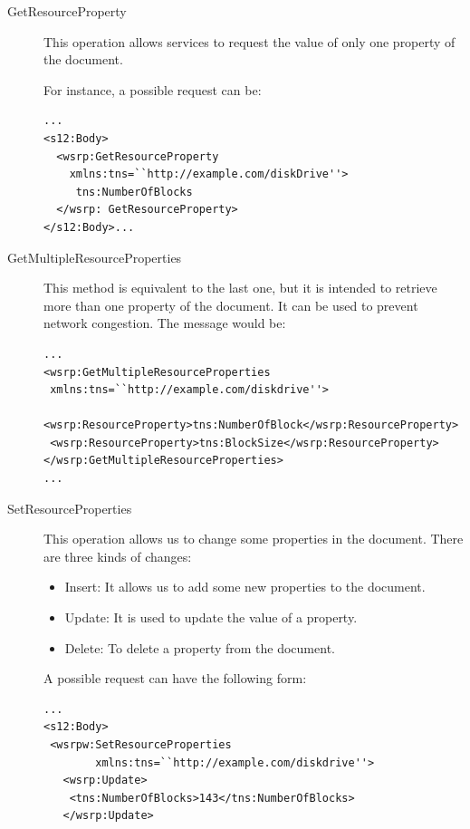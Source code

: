 \begin{description}
\item[GetResourceProperty]
This operation allows services to request 
the value of only one property of the document.

For instance, a possible request can be:


\begin{lstlisting}
...
<s12:Body>
  <wsrp:GetResourceProperty 
    xmlns:tns=``http://example.com/diskDrive''>
     tns:NumberOfBlocks
  </wsrp: GetResourceProperty>
</s12:Body>...
\end{lstlisting}

\item[GetMultipleResourceProperties]
This method is equivalent to the last one, but it is intended to retrieve
more than one property of the document. 
It can be used to prevent network congestion. The message would be:
\newpage
\lstset{language=XML, numbersep=5pt,basicstyle=\scriptsize ,frame=single}
\begin{lstlisting}
...
<wsrp:GetMultipleResourceProperties
 xmlns:tns=``http://example.com/diskdrive''>
 <wsrp:ResourceProperty>tns:NumberOfBlock</wsrp:ResourceProperty>
 <wsrp:ResourceProperty>tns:BlockSize</wsrp:ResourceProperty>
</wsrp:GetMultipleResourceProperties>
...
\end{lstlisting}

\item[SetResourceProperties]
This operation allows us to change some properties in the document. There are three kinds of changes:

\begin{itemize}
\item Insert: It allows us to add some new properties to the document.
\item Update: It is used to update the value of a property.
\item Delete: To delete a property from the document.
\end{itemize}

A possible request can have the following form:

\begin{lstlisting}
...
<s12:Body>
 <wsrpw:SetResourceProperties
        xmlns:tns=``http://example.com/diskdrive''>
   <wsrp:Update>
    <tns:NumberOfBlocks>143</tns:NumberOfBlocks>
   </wsrp:Update>


\end{lstlisting}
\end{description}
